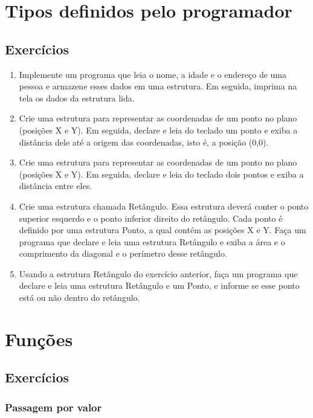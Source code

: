 \documentclass[a4paper,12pt]{article}
\begin{document}
\pagebreak
\section{Tipos definidos pelo programador}

\setcounter{subsection}{4}
\subsection{Exercícios}

\begin{enumerate}
  \item Implemente um programa que leia o nome, a idade e o endereço de uma pessoa e armazene esses dados em uma estrutura. Em seguida, imprima na tela os dados da estrutura lida.
  \item Crie uma estrutura para representar as coordenadas de um ponto no plano (posições X e Y). Em seguida, declare e leia do teclado um ponto e exiba a distância dele até a origem das coordenadas, isto é, a posição (0,0).
  \item Crie uma estrutura para representar as coordenadas de um ponto no plano (posições X e Y). Em seguida, declare e leia do teclado dois pontos e exiba a distância entre eles.
  \item Crie uma estrutura chamada Retângulo. Essa estrutura deverá conter o ponto superior esquerdo e o ponto inferior direito do retângulo. Cada ponto é definido por uma estrutura Ponto, a qual contém as posições X e Y. Faça um programa que declare e leia uma estrutura Retângulo e exiba a área e o comprimento da diagonal e o perímetro desse retângulo.
  \item Usando a estrutura Retângulo do exercício anterior, faça um programa que declare e leia uma estrutura Retângulo e um Ponto, e informe se esse ponto está ou não dentro do retângulo.
\end{enumerate}

\pagebreak
\section{Funções}

\setcounter{subsection}{3}
\subsection{Exercícios}

\subsubsection{Passagem por valor}
\end{document}
